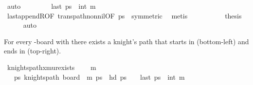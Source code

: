 \begin{isabellebody}
\ auto\isanewline
\ \ \ \ \isamarkupfalse%
\ \isamarkupfalse%
\ {}{\isacharcolon}{\kern0pt}\ {\isachardoublequoteopen}last\ {\isacharquery}{\kern0pt}ps\ {\isacharequal}{\kern0pt}\ {\isacharparenleft}{\kern0pt}{}{\isacharcomma}{\kern0pt}int\ m{\isacharminus}{\kern0pt}{}{\isacharparenright}{\kern0pt}{\isachardoublequoteclose}\isanewline
\ \ \ \ \ \ \isamarkupfalse%
\ last{\isacharunderscore}{\kern0pt}appendR{\isacharbrackleft}{\kern0pt}OF\ trans{\isacharunderscore}{\kern0pt}path{\isacharunderscore}{\kern0pt}non{\isacharunderscore}{\kern0pt}nil{\isacharbrackleft}{\kern0pt}OF\ {\isacartoucheopen}{\isacharquery}{\kern0pt}ps\ {\isasymnoteq}\ {\isacharbrackleft}{\kern0pt}{\isacharbrackright}{\kern0pt}{\isacartoucheclose}{\isacharbrackright}{\kern0pt}{\isacharcomma}{\kern0pt}symmetric{\isacharbrackright}{\kern0pt}\ \isamarkupfalse%
\ metis\isanewline
\ \ \ \ \isanewline
\ \ \ \ \isamarkupfalse%
\ {\isacharquery}{\kern0pt}thesis\ \isamarkupfalse%
\ {}\ {}\ {}\ \isamarkupfalse%
\ auto\isanewline
\ \ \isamarkupfalse%
\isanewline
{}\isamarkupfalse%
%
\endisatagproof
{\isafoldproof}%
%
\isadelimproof
%
\endisadelimproof
%
\begin{isamarkuptext}%
For every -board with  there exists a knight's path that starts in 
 (bottom-left) and ends in  (top-right).%
\end{isamarkuptext}\isamarkuptrue%
\isamarkupfalse%
\ knights{\isacharunderscore}{\kern0pt}path{\isacharunderscore}{\kern0pt}{}xm{\isacharunderscore}{\kern0pt}ur{\isacharunderscore}{\kern0pt}exists{\isacharcolon}{\kern0pt}\ \isanewline
\ \ \ {\isachardoublequoteopen}m\ {\isasymge}\ {}{\isachardoublequoteclose}\ \isanewline
\ \ \ {\isachardoublequoteopen}{\isasymexists}ps{\isachardot}{\kern0pt}\ knights{\isacharunderscore}{\kern0pt}path\ {\isacharparenleft}{\kern0pt}board\ {}\ m{\isacharparenright}{\kern0pt}\ ps\ {\isasymand}\ hd\ ps\ {\isacharequal}{\kern0pt}\ {\isacharparenleft}{\kern0pt}{}{\isacharcomma}{\kern0pt}{}{\isacharparenright}{\kern0pt}\ {\isasymand}\ last\ ps\ {\isacharequal}{\kern0pt}\ {\isacharparenleft}{\kern0pt}{}{\isacharcomma}{\kern0pt}int\ m{\isacharminus}{\kern0pt}{}{\isacharparenright}{\kern0pt}{\isachardoublequoteclose}\isanewline

\end{isabellebody}
